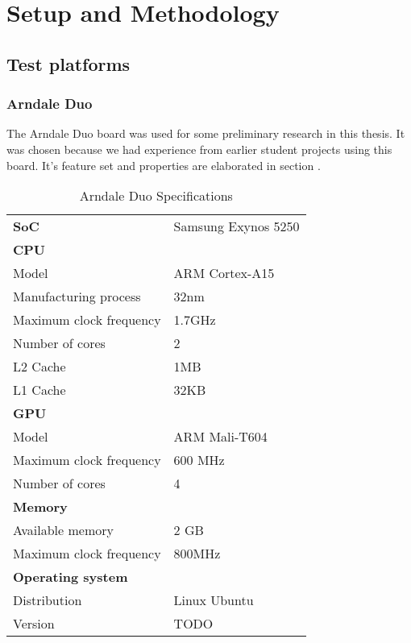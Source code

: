 \chapter[Setup and Methodology]{Setup and Methodology} \label{setupandmethodology}

\section{Test platforms}

\subsection{Arndale Duo}
The Arndale Duo board was used for some preliminary research in this thesis.
It was chosen because we had experience from earlier student projects using this board.
It's feature set and properties are elaborated in section .
\begin{table}[h]
  \begin{tabular}{ll}
    \textbf{SoC}              & Samsung Exynos 5250 \\
    \textbf{CPU}              &  \\
    Model                     & ARM Cortex-A15 \\
    Manufacturing process     & 32nm \\
    Maximum clock frequency   & 1.7GHz \\
    Number of cores           & 2 \\
    L2 Cache                  & 1MB \\
    L1 Cache                  & 32KB \\
    \textbf{GPU}              &  \\
    Model                     & ARM Mali-T604 \\
    Maximum clock frequency   & 600 MHz \\
    Number of cores           & 4 \\
    \textbf{Memory}           &  \\
    Available memory          & 2 GB \\
    Maximum clock frequency   & 800MHz \\
    \textbf{Operating system} &  \\
    Distribution              & Linux Ubuntu \\
    Version                   & TODO
  \end{tabular}
  \caption{Arndale Duo Specifications\label{overflow}}
\end{table}
